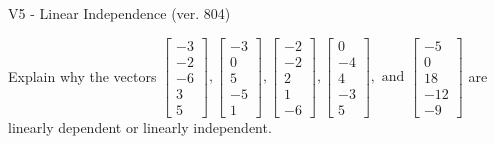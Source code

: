 \begin{exercise}
  \begin{exerciseTitle}V5 - Linear Independence (ver. 804)\end{exerciseTitle}
  \begin{exerciseStatement}
    Explain why the vectors \(\left[\begin{array}{r}
-3 \\
-2 \\
-6 \\
3 \\
5
\end{array}\right] , \left[\begin{array}{r}
-3 \\
0 \\
5 \\
-5 \\
1
\end{array}\right] , \left[\begin{array}{r}
-2 \\
-2 \\
2 \\
1 \\
-6
\end{array}\right] , \left[\begin{array}{r}
0 \\
-4 \\
4 \\
-3 \\
5
\end{array}\right] , \text{ and } \left[\begin{array}{r}
-5 \\
0 \\
18 \\
-12 \\
-9
\end{array}\right]\) are linearly dependent or linearly independent.	



\end{exerciseStatement}
\end{exercise}
